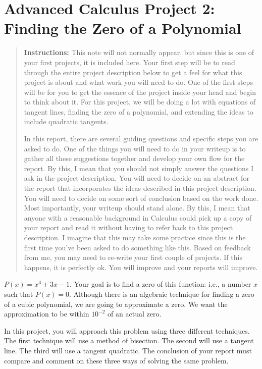 \documentclass
[justified,nohyper]
{tufte-handout}
\theoremstyle{mydef}
\begin{document}
\section{Advanced Calculus Project 2: Finding the Zero of a Polynomial}

\begin{quote}
\textbf{Instructions:} This note will not normally appear, but since this is one of your first projects, it is included here. Your first step will be to read through the entire project description below to get a feel for what this project is about and what work you will need to do. One of the first steps will be for you to get the essence of the project inside your head and begin to think about it. For this project, we will be doing a lot with equations of tangent lines, finding the zero of a polynomial, and extending the ideas to include quadratic tangents.

In this report, there are several guiding questions and specific steps you are asked to do. One of the things you will need to do in your writeup is to gather all these suggestions together and develop your own flow for the report. By this, I mean that you should not simply answer the questions I ask in the project description. You will need to decide on an abstract for the report that incorporates the ideas described in this project description. You will need to decide on some sort of conclusion based on the work done. Most importantly, your writeup should stand alone. By this, I mean that anyone with a reasonable background in Calculus could pick up a copy of your report and read it without having to refer back to this project description. I imagine that this may take some practice since this is the first time you've been asked to do something like this. Based on feedback from me, you may need to re-write your first couple of projects. If this happens, it is perfectly ok. You will improve and your reports will improve.
\end{quote}

 $P(x)=x^3+3x-1$. Your goal is to find a zero of this function: i.e., a number $x$ such that $P(x)=0$. Although there is an algebraic technique for finding a zero of a cubic polynomial, we are going to approximate a zero. We want the approximation to be within $10^{-2}$ of an actual zero.

In this project, you will approach this problem using three different techniques. The first technique will use a method of bisection. The second will use a tangent line. The third will use a tangent quadratic. The conclusion of your report must compare and comment on these three ways of solving the same problem.
\end{document}
